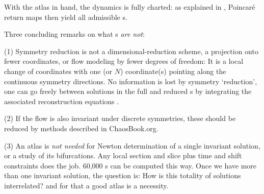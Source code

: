 \documentclass[aip,cha,reprint,
secnumarabic,
nofootinbib, tightenlines,
nobibnotes, showkeys, showpacs,
groupedaddress
]{revtex4-1}
\begin{document}
With the atlas in hand, the dynamics is fully charted: as explained in
, Poincar\'e return maps then yield all
admissible \rpo s.

Three concluding remarks on what \slice s \emph{are not}:

(1) Symmetry reduction is not a dimensional-reduction scheme, a
projection onto fewer coordinates, or flow modeling by fewer degrees of
freedom: It is a local change of coordinates with one (or $N$) coordinate(s)
pointing along the continuous symmetry directions. No information is lost
by symmetry `reduction', one can go freely between solutions in the full
and reduced \statesp s by integrating the associated {reconstruction
equations} .

(2) If the flow is also invariant under discrete symmetries, these should
be reduced by methods described in ChaosBook.org.

(3) An atlas is \emph{not needed} for Newton determination of a single
invariant solution, or a study of its bifurcations. Any local
section and slice plus time and shift constraints does the job. 60,000
\rpo s can be computed this way. Once we have more than one
invariant solution, the question is: How is this totality of solutions
interrelated? and for that a good atlas is a necessity.
\end{document}
